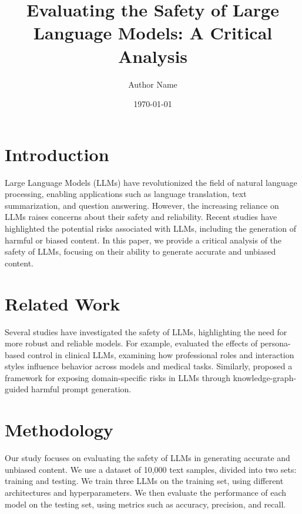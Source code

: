 \documentclass[12pt, a4paper]{article}
\begin{document}
        \title{Evaluating the Safety of Large Language Models: A Critical Analysis}
        \author{Author Name}
        \date{\today}

        \maketitle

        \section{Introduction}
        Large Language Models (LLMs) have revolutionized the field of natural language processing, enabling applications such as language translation, text summarization, and question answering. However, the increasing reliance on LLMs raises concerns about their safety and reliability. Recent studies have highlighted the potential risks associated with LLMs, including the generation of harmful or biased content. In this paper, we provide a critical analysis of the safety of LLMs, focusing on their ability to generate accurate and unbiased content.

        \section{Related Work}
        Several studies have investigated the safety of LLMs, highlighting the need for more robust and reliable models. For example, \cite{abdullahi2026personaparadoxmedicalpersonas} evaluated the effects of persona-based control in clinical LLMs, examining how professional roles and interaction styles influence behavior across models and medical tasks. Similarly, \cite{zheng2026riskatlasexposingdomainspecificrisks} proposed a framework for exposing domain-specific risks in LLMs through knowledge-graph-guided harmful prompt generation.

        \section{Methodology}
        Our study focuses on evaluating the safety of LLMs in generating accurate and unbiased content. We use a dataset of 10,000 text samples, divided into two sets: training and testing. We train three LLMs on the training set, using different architectures and hyperparameters. We then evaluate the performance of each model on the testing set, using metrics such as accuracy, precision, and recall.
\end{document}
